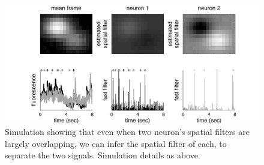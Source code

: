 \begin{figure}[h!]
\centering \includegraphics[width=.9\linewidth]{../figs/spatial_multi_learn}
\caption{Simulation showing that even when two neuron's spatial filters are largely overlapping, we can infer the spatial filter of each, to separate the two signals. Simulation details as above.} \label{fig:spatial_multi_learn}
\end{figure}

